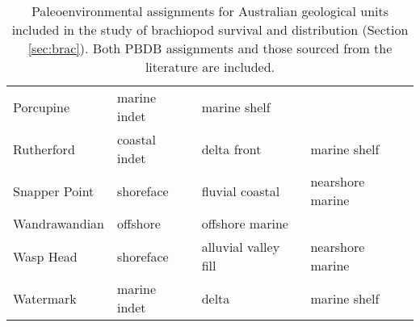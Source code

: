 \begin{table}[ht]
\begin{tabular}{llll}
    Porcupine & marine indet & marine shelf &  \\ 
    Rutherford & coastal indet & delta front & marine shelf \\ 
    Snapper Point & shoreface & fluvial coastal & nearshore marine \\ 
    Wandrawandian & offshore & offshore marine &  \\ 
    Wasp Head & shoreface & alluvial valley fill & nearshore marine \\ 
    Watermark & marine indet & delta & marine shelf \\ 
    \hline
  \end{tabular}
  \caption[Improvements to PBDB geological information]{Paleoenvironmental assignments for Australian geological units included in the study of brachiopod survival and distribution (Section \ref{sec:brac}). Both PBDB assignments and those sourced from the literature are included.} 
  \label{tab:paleoenv}
\end{table}
